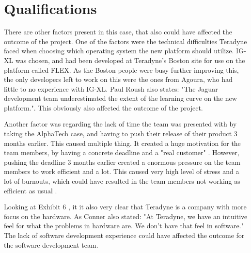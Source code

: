 \section{Qualifications}

There are other factors present in this case, that also could have affected the outcome of the project.
One of the factors were the technical difficulties Teradyne faced when choosing which operating system the new platform should utilize. IG-XL was chosen, and had been developed at Teradyne's Boston site for use on the platform called FLEX. As the Boston people were busy further improving this, the only developers left to work on this were the ones from Agoura, who had little to no experience with IG-XL. Paul Roush also states: "The Jaguar development team underestimated the extent of the learning curve on the new platform."\cite[p. 9]{GinoPisano2005}. This obviously also affected the outcome of the project.

Another factor was regarding the lack of time the team was presented with by taking the AlphaTech case, and having to push their release of their product 3 months earlier. This caused multiple thing. It created a huge motivation for the team members, by having a concrete deadline and a "real customer" \cite[p. 10]{GinoPisano2005}. However, pushing the deadline 3 months earlier created a enormous pressure on the team members to work efficient and a lot. This caused very high level of stress and a lot of burnouts, which could have resulted in the team members not working as efficient as usual \cite[p. 10]{GinoPisano2005}. 

Looking at Exhibit 6 \cite[p. 20]{GinoPisano2005}, it it also very clear that Teradyne is a company with more focus on the hardware. As Conner also stated: "At Teradyne, we have an intuitive feel for what the problems in hardware are. We don't have that feel in software."\cite[p. 10]{GinoPisano2005} The lack of software development experience could have affected the outcome for the software development team. 
